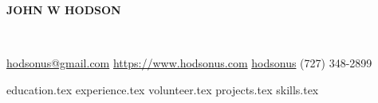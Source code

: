 \documentclass[11pt]{article}
\newcommand*{\sectiondir}{sections/}
\newcommand*{\headerspace}{\vspace{.05cm}}
\begin{document}
	\noindent\centerline{ \huge\textbf{JOHN W HODSON} }\\
	\headerspace

	\noindent
	\faEnvelopeSquare \space \href{mailto:hodsonus@gmail.com}{hodsonus@gmail.com} \hspace*{\fill}
	\faHome \space \href{https://www.hodsonus.com}{https://www.hodsonus.com} \hspace*{\fill}
	\faGithub \space \href{https://github.com/hodsonus}{hodsonus} \hspace*{\fill}
	\faMobilePhone \space (727) 348-2899\\
	\headerspace

	{education.tex}
	{experience.tex}
	{volunteer.tex}
	{projects.tex}
	{skills.tex}

	\rfoot{\today}
\end{document}
